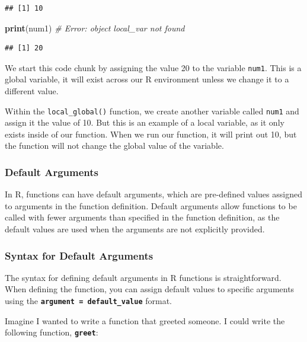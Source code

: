 \documentclass[
]{book}
\newenvironment{Shaded}{\begin{snugshade}}{\end{snugshade}}
\newcommand{\CommentTok}[1]{\textcolor[rgb]{0.56,0.35,0.01}{\textit{#1}}}
\newcommand{\FunctionTok}[1]{\textcolor[rgb]{0.13,0.29,0.53}{\textbf{#1}}}
\newcommand{\NormalTok}[1]{#1}
\begin{document}
\begin{verbatim}
## [1] 10
\end{verbatim}

\begin{Shaded}
\begin{Highlighting}[]
\FunctionTok{print}\NormalTok{(num1)  }\CommentTok{\# Error: object \textquotesingle{}local\_var\textquotesingle{} not found}
\end{Highlighting}
\end{Shaded}

\begin{verbatim}
## [1] 20
\end{verbatim}

We start this code chunk by assigning the value 20 to the variable \texttt{num1}. This is a global variable, it will exist across our R environment unless we change it to a different value.

Within the \texttt{local\_global()} function, we create another variable called \texttt{num1} and assign it the value of 10. But this is an example of a local variable, as it only exists inside of our function. When we run our function, it will print out 10, but the function will not change the global value of the variable.

\hypertarget{default-arguments}{%
\subsubsection{Default Arguments}\label{default-arguments}}

In R, functions can have default arguments, which are pre-defined values assigned to arguments in the function definition. Default arguments allow functions to be called with fewer arguments than specified in the function definition, as the default values are used when the arguments are not explicitly provided.

\hypertarget{syntax-for-default-arguments}{%
\subsubsection{Syntax for Default Arguments}\label{syntax-for-default-arguments}}

The syntax for defining default arguments in R functions is straightforward. When defining the function, you can assign default values to specific arguments using the \textbf{\texttt{argument\ =\ default\_value}} format.

Imagine I wanted to write a function that greeted someone. I could write the following function, \textbf{\texttt{greet}}:
\end{document}
